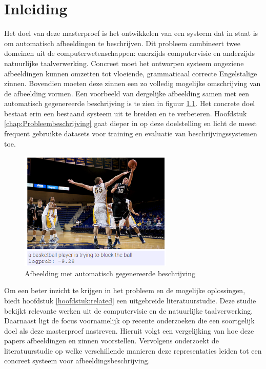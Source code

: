 \chapter{Inleiding}
\label{inleiding}
Het doel van deze masterproef is het ontwikkelen van een systeem dat in staat is om automatisch afbeeldingen te beschrijven. Dit probleem combineert twee domeinen uit de computerwetenschappen: enerzijds computervisie en anderzijds natuurlijke taalverwerking. Concreet moet het ontworpen systeem ongeziene afbeeldingen kunnen omzetten tot vloeiende, grammaticaal correcte Engelstalige zinnen. Bovendien moeten deze zinnen een zo volledig mogelijke omschrijving van de afbeelding vormen. Een voorbeeld van dergelijke afbeelding samen met een automatisch gegenereerde beschrijving is te zien in figuur \ref{fig:example_img}. Het concrete doel bestaat erin een bestaand systeem uit te breiden en te verbeteren. Hoofdstuk \ref{chap:Probleembeschrijving} gaat dieper in op deze doelstelling en licht de meest frequent gebruikte datasets voor training en evaluatie van beschrijvingssystemen toe.

\begin{figure}[tb]
    \centering
    \includegraphics[width=0.65\textwidth]{Images/Results/Perfect/blocking_the_ball}
    \caption{Afbeelding met automatisch gegenereerde beschrijving}
    \label{fig:example_img}
\end{figure}

Om een beter inzicht te krijgen in het probleem en de mogelijke oplossingen, biedt hoofdstuk \ref{hoofdstuk:related} een uitgebreide literatuurstudie. Deze studie bekijkt relevante werken uit de computervisie en de natuurlijke taalverwerking. Daarnaast ligt de focus voornamelijk op recente onderzoeken die een soortgelijk doel als deze masterproef nastreven. Hieruit volgt een vergelijking van hoe deze papers afbeeldingen en zinnen voorstellen. Vervolgens onderzoekt de literatuurstudie op welke verschillende manieren deze representaties leiden tot een concreet systeem voor afbeeldingsbeschrijving.

